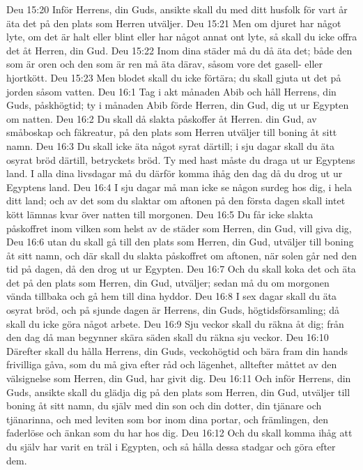 Deu 15:20  Inför Herrens, din Guds, ansikte skall du med ditt husfolk för vart år äta det på den plats som Herren utväljer.
Deu 15:21  Men om djuret har något lyte, om det är halt eller blint eller har något annat ont lyte, så skall du icke offra det åt Herren, din Gud.
Deu 15:22  Inom dina städer må du då äta det; både den som är oren och den som är ren må äta därav, såsom vore det gasell- eller hjortkött.
Deu 15:23  Men blodet skall du icke förtära; du skall gjuta ut det på jorden såsom vatten.
Deu 16:1  Tag i akt månaden Abib och håll Herrens, din Guds, påskhögtid; ty i månaden Abib förde Herren, din Gud, dig ut ur Egypten om natten.
Deu 16:2  Du skall då slakta påskoffer åt Herren. din Gud, av småboskap och fäkreatur, på den plats som Herren utväljer till boning åt sitt namn.
Deu 16:3  Du skall icke äta något syrat därtill; i sju dagar skall du äta osyrat bröd därtill, betryckets bröd. Ty med hast måste du draga ut ur Egyptens land. I alla dina livsdagar må du därför komma ihåg den dag då du drog ut ur Egyptens land.
Deu 16:4  I sju dagar må man icke se någon surdeg hos dig, i hela ditt land; och av det som du slaktar om aftonen på den första dagen skall intet kött lämnas kvar över natten till morgonen.
Deu 16:5  Du får icke slakta påskoffret inom vilken som helst av de städer som Herren, din Gud, vill giva dig,
Deu 16:6  utan du skall gå till den plats som Herren, din Gud, utväljer till boning åt sitt namn, och där skall du slakta påskoffret om aftonen, när solen går ned den tid på dagen, då den drog ut ur Egypten.
Deu 16:7  Och du skall koka det och äta det på den plats som Herren, din Gud, utväljer; sedan må du om morgonen vända tillbaka och gå hem till dina hyddor.
Deu 16:8  I sex dagar skall du äta osyrat bröd, och på sjunde dagen är Herrens, din Guds, högtidsförsamling; då skall du icke göra något arbete.
Deu 16:9  Sju veckor skall du räkna åt dig; från den dag då man begynner skära säden skall du räkna sju veckor.
Deu 16:10  Därefter skall du hålla Herrens, din Guds, veckohögtid och bära fram din hands frivilliga gåva, som du må giva efter råd och lägenhet, alltefter måttet av den välsignelse som Herren, din Gud, har givit dig.
Deu 16:11  Och inför Herrens, din Guds, ansikte skall du glädja dig på den plats som Herren, din Gud, utväljer till boning åt sitt namn, du själv med din son och din dotter, din tjänare och tjänarinna, och med leviten som bor inom dina portar, och främlingen, den faderlöse och änkan som du har hos dig.
Deu 16:12  Och du skall komma ihåg att du själv har varit en träl i Egypten, och så hålla dessa stadgar och göra efter dem.
